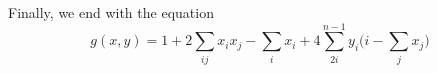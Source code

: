 \documentclass[a4paper,english,notitlepage,longbibliography,showpacs,preprintnumbers,amsmath,amssymb,aps,prx,nofootinbib,12pt,superscriptaddress]{revtex4-1}
\begin{document}
\noindent Finally, we end with the equation
\begin{equation}
  g(x,y) = 1 + 2\sum_{ij}x_ix_j - \sum_{i} x_i + 4\sum_{2i}^{n-1}y_i\Big(i - \sum_{j} x_j\Big)
\end{equation}


\begin{comment}
  \subsection{SFR-BCR-8} THIS WAS JUST SFR-BCR-3/4 FOUND IN THE OTHER PAPER

  Take the quadratization of the exact k-out-of-n function $f_{=k}$:
  \\(Theorem 7, \cite{Boros2018boundsPaper})

  \begin{equation}
  \begin{split}
    \left.
    G_k(x,y,z)
    \right.
    &= \frac{1}{2}A_k(x,y,z)(A_k(x,y,z)-1)\\
    &= \frac{1}{2}\left(A_k(x,y,z)^2-A_k(x,y,z)\right)
  \end{split}
  \end{equation}

  \noindent Where
  \begin{equation}
    A_k(X,y,z) = |x| - (k-2^l)z - (k+1)(1-z) - \sum_{j}^{l-1}2^jy_j.
  \end{equation}


  \noindent We have $A_k(x,y,z)^2$ from \eqref{eq:alpha12} and $A_k(x,y,z)$ from \eqref{eq:Ak1}, thus when we substitute the two equations and collect like terms we end with
  \begin{equation}
  \begin{split}
    \left.
    G_k(x,y,z)
    \right.
    &=\underbrace{\frac{1}{2}(k^2+3k+2)}_{\alpha}
    + \underbrace{-\frac{1}{2}(2k+3)}_{\alpha^{b}} \sum_i x_i
    + \sum_j \underbrace{(k+2)2^{j-1}}_{\alpha^{b_{a,1}}}y_j
    + \underbrace{\frac{1}{2}(1+2^l)(2^l-2k-2)}_{\alpha^{b_{a,2}}}z \\
    &+ \underbrace{\frac{1}{2}}_{\alpha^{bb}} \sum_{i,i'} x_ix_{i'}
    + \sum_{i,j} \underbrace{-2^{j}}_{\alpha^{bb_{a,1}}}x_iy_j
    + \underbrace{(1+2^l)}_{\alpha^{bb_{a,2}}}\sum_i x_iz \\
    &+ \sum_{j,j'} \underbrace{2^{j+j'-1}}_{\alpha^{b_ab_{a,1}}}y_jy_{j'}
    + \sum_j \underbrace{-(1+2^l)2^{j}}_{\alpha^{b_ab_{a,2}}} y_j z
  \end{split}
  \end{equation}


\end{comment}
\end{document}
